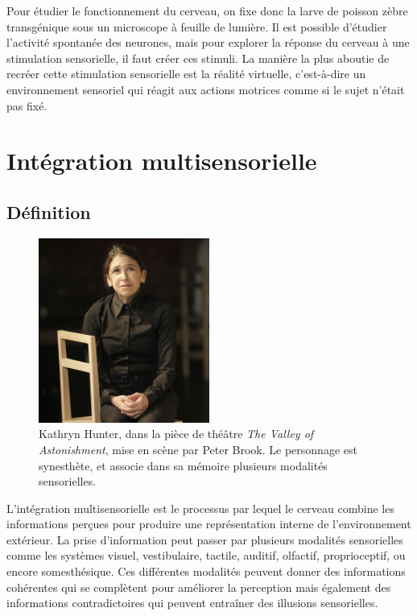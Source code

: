 Pour étudier le fonctionnement du cerveau, on fixe donc la larve de poisson zèbre transgénique sous un microscope à feuille de lumière. Il est possible d'étudier l'activité spontanée des neurones, mais pour explorer la réponse du cerveau à une stimulation sensorielle, il faut créer ces stimuli. La manière la plus aboutie de recréer cette stimulation sensorielle est la réalité virtuelle, c'est-à-dire un environnement sensoriel qui réagit aux actions motrices comme si le sujet n'était pas fixé.


\section{Intégration multisensorielle}

\subsection{Définition}

\begin{figure}
  \centering
  \includegraphics[width=0.5\textwidth]{./files/Kathryn-Hunter_Peter-Brook_valley-of-astonishement.jpg}
  \caption{Kathryn Hunter, dans la pièce de théâtre \emph{The Valley of Astonishment}, mise en scène par Peter Brook. Le personnage est synesthète, et associe dans sa mémoire plusieurs modalités sensorielles.}
  \end{figure}

L'intégration multisensorielle est le processus par lequel le cerveau combine les informations perçues pour produire une représentation interne de l'environnement extérieur. La prise d'information peut passer par plusieurs modalités sensorielles comme les systèmes visuel, vestibulaire, tactile, auditif, olfactif, proprioceptif, ou encore somesthésique. Ces différentes modalités peuvent donner des informations cohérentes qui se complètent pour améliorer la perception mais également des informations contradictoires qui peuvent entraîner des illusions sensorielles.

